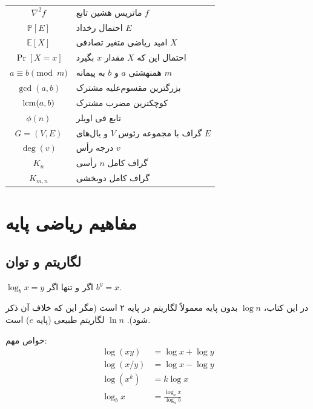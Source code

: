 \documentclass{matinbook}
\begin{document}
\begin{table}[h]
\begin{tabular}{|c|C{8cm}|}
            $\nabla^{2} f$ & ماتریس هشین تابع $f$ \\
            $\mathbb{P}[E]$ & احتمال رخداد $E$ \\
            $\mathbb{E}[X]$ & امید ریاضی متغیر تصادفی $X$ \\
            $\Pr[X = x]$ & احتمال این که $X$ مقدار $x$ بگیرد \\
            $a \equiv b \pmod{m}$ & همنهشتی $a$ و $b$ به پیمانه $m$ \\
            $\gcd(a, b)$ & بزرگترین مقسوم‌علیه مشترک \\
            $\operatorname{lcm}(a, b)$ & کوچکترین مضرب مشترک \\
            $\phi(n)$ & تابع فی اویلر \\
            $G = (V, E)$ & گراف با مجموعه رئوس $V$ و یال‌های $E$ \\
            $\deg(v)$ & درجه رأس $v$ \\
            $K_{n}$ & گراف کامل $n$ رأسی \\
            $K_{m,n}$ & گراف کامل دوبخشی \\
            \hline
        \end{tabular}
    \end{table}
    
    \chapter{مفاهیم ریاضی پایه}
    \label{app:math-basics}
    
    \section{لگاریتم و توان}
    
    \begin{definition}[لگاریتم]
        $\log_{b} x = y$ اگر و تنها اگر $b^{y} = x$.
        \label{def:logarithm}
    \end{definition}
    
    در این کتاب، $\log n$ بدون پایه
    معمولاً لگاریتم در پایه ۲ است
    (مگر این که خلاف آن ذکر شود).
    $\ln n$ لگاریتم طبیعی (پایه $e$) است.
    
    خواص مهم:
    \begin{align}
        \log(xy) &= \log x + \log y \\
        \log(x/y) &= \log x - \log y \\
        \log(x^{k}) &= k \log x \\
        \log_{b} x &= \frac{\log_{a} x}{\log_{a} b}
    \end{align}
    
\end{document}
